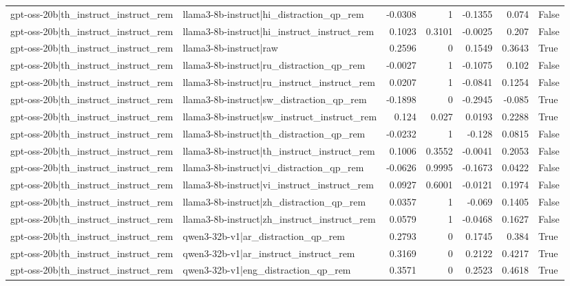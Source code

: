 \begin{table}
\begin{tabular}{l l r r r r l}
gpt-oss-20b|th_instruct_instruct_rem & llama3-8b-instruct|hi_distraction_qp_rem & -0.0308 & 1 & -0.1355 & 0.074 & False \\
gpt-oss-20b|th_instruct_instruct_rem & llama3-8b-instruct|hi_instruct_instruct_rem & 0.1023 & 0.3101 & -0.0025 & 0.207 & False \\
gpt-oss-20b|th_instruct_instruct_rem & llama3-8b-instruct|raw & 0.2596 & 0 & 0.1549 & 0.3643 & True \\
gpt-oss-20b|th_instruct_instruct_rem & llama3-8b-instruct|ru_distraction_qp_rem & -0.0027 & 1 & -0.1075 & 0.102 & False \\
gpt-oss-20b|th_instruct_instruct_rem & llama3-8b-instruct|ru_instruct_instruct_rem & 0.0207 & 1 & -0.0841 & 0.1254 & False \\
gpt-oss-20b|th_instruct_instruct_rem & llama3-8b-instruct|sw_distraction_qp_rem & -0.1898 & 0 & -0.2945 & -0.085 & True \\
gpt-oss-20b|th_instruct_instruct_rem & llama3-8b-instruct|sw_instruct_instruct_rem & 0.124 & 0.027 & 0.0193 & 0.2288 & True \\
gpt-oss-20b|th_instruct_instruct_rem & llama3-8b-instruct|th_distraction_qp_rem & -0.0232 & 1 & -0.128 & 0.0815 & False \\
gpt-oss-20b|th_instruct_instruct_rem & llama3-8b-instruct|th_instruct_instruct_rem & 0.1006 & 0.3552 & -0.0041 & 0.2053 & False \\
gpt-oss-20b|th_instruct_instruct_rem & llama3-8b-instruct|vi_distraction_qp_rem & -0.0626 & 0.9995 & -0.1673 & 0.0422 & False \\
gpt-oss-20b|th_instruct_instruct_rem & llama3-8b-instruct|vi_instruct_instruct_rem & 0.0927 & 0.6001 & -0.0121 & 0.1974 & False \\
gpt-oss-20b|th_instruct_instruct_rem & llama3-8b-instruct|zh_distraction_qp_rem & 0.0357 & 1 & -0.069 & 0.1405 & False \\
gpt-oss-20b|th_instruct_instruct_rem & llama3-8b-instruct|zh_instruct_instruct_rem & 0.0579 & 1 & -0.0468 & 0.1627 & False \\
gpt-oss-20b|th_instruct_instruct_rem & qwen3-32b-v1|ar_distraction_qp_rem & 0.2793 & 0 & 0.1745 & 0.384 & True \\
gpt-oss-20b|th_instruct_instruct_rem & qwen3-32b-v1|ar_instruct_instruct_rem & 0.3169 & 0 & 0.2122 & 0.4217 & True \\
gpt-oss-20b|th_instruct_instruct_rem & qwen3-32b-v1|eng_distraction_qp_rem & 0.3571 & 0 & 0.2523 & 0.4618 & True \\

\end{tabular}
\end{table}
